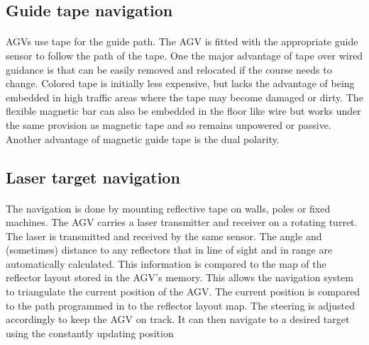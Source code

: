 \subsection{Guide tape navigation}
\paragraph{}AGVs use tape for the guide path. The AGV is fitted with the appropriate guide sensor to follow the path of the tape. One the major advantage of tape over wired guidance is that can be easily removed and relocated if the course needs to change. Colored tape is initially less expensive, but lacks the advantage of being embedded in high traffic areas where the tape may become damaged or dirty. The flexible magnetic bar can also be embedded in the floor like wire but works under the same provision as magnetic tape and so remains unpowered or passive. Another advantage of magnetic guide tape is the dual polarity.

\subsection{Laser target navigation}
\paragraph{}The navigation is done by mounting reflective tape on walls, poles or fixed machines. The AGV carries a laser transmitter and receiver on a rotating turret. The laser is transmitted and received by the same sensor. The angle and (sometimes) distance to any reflectors that in line of sight and in range are automatically calculated. This information is compared to the map of the reflector layout stored in the AGV's memory. This allows the navigation system to triangulate the current position of the AGV. The current position is compared to the path programmed in to the reflector layout map. The steering is adjusted accordingly to keep the AGV on track. It can then navigate to a desired target using the constantly updating position